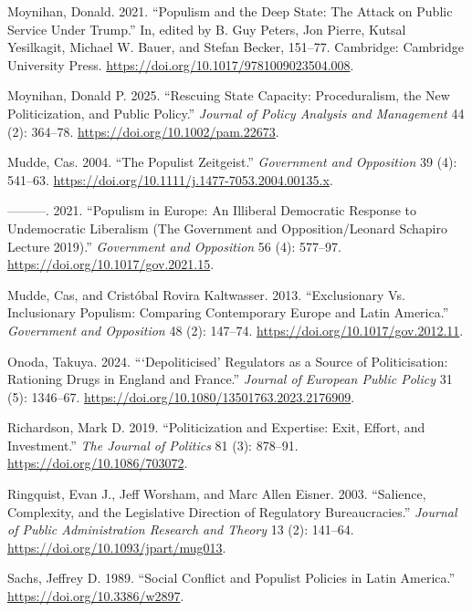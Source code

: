 \documentclass[
  11pt,
  letterpaper,
  DIV=11,
  numbers=noendperiod]{scrartcl}
\newlength{\cslhangindent}
\newenvironment{CSLReferences}[2] %
 {\begin{list}{}{%
  \setlength{\itemindent}{0pt}
  \setlength{\leftmargin}{0pt}
  \setlength{\parsep}{0pt}
  \ifodd #1
   \setlength{\leftmargin}{\cslhangindent}
   \setlength{\itemindent}{-1\cslhangindent}
  \fi
  \setlength{\itemsep}{#2\baselineskip}}}
 {\end{list}}
\begin{document}
\begin{CSLReferences}{1}{0}
Moynihan, Donald. 2021. {``Populism and the Deep State: The Attack on
Public Service Under Trump.''} In, edited by B. Guy Peters, Jon Pierre,
Kutsal Yesilkagit, Michael W. Bauer, and Stefan Becker, 151--77.
Cambridge: Cambridge University Press.
\url{https://doi.org/10.1017/9781009023504.008}.

Moynihan, Donald P. 2025. {``Rescuing State Capacity: Proceduralism, the
New Politicization, and Public Policy.''} \emph{Journal of Policy
Analysis and Management} 44 (2): 364--78.
\url{https://doi.org/10.1002/pam.22673}.

Mudde, Cas. 2004. {``The Populist Zeitgeist.''} \emph{Government and
Opposition} 39 (4): 541--63.
\url{https://doi.org/10.1111/j.1477-7053.2004.00135.x}.

---------. 2021. {``Populism in Europe: An Illiberal Democratic Response
to Undemocratic Liberalism (The Government and Opposition/Leonard
Schapiro Lecture 2019).''} \emph{Government and Opposition} 56 (4):
577--97. \url{https://doi.org/10.1017/gov.2021.15}.

Mudde, Cas, and Cristóbal Rovira Kaltwasser. 2013. {``Exclusionary Vs.
Inclusionary Populism: Comparing Contemporary Europe and Latin
America.''} \emph{Government and Opposition} 48 (2): 147--74.
\url{https://doi.org/10.1017/gov.2012.11}.

Onoda, Takuya. 2024. {``{`}Depoliticised{'} Regulators as a Source of
Politicisation: Rationing Drugs in England and France.''} \emph{Journal
of European Public Policy} 31 (5): 1346--67.
\url{https://doi.org/10.1080/13501763.2023.2176909}.

Richardson, Mark D. 2019. {``Politicization and Expertise: Exit, Effort,
and Investment.''} \emph{The Journal of Politics} 81 (3): 878--91.
\url{https://doi.org/10.1086/703072}.

Ringquist, Evan J., Jeff Worsham, and Marc Allen Eisner. 2003.
{``Salience, Complexity, and the Legislative Direction of Regulatory
Bureaucracies.''} \emph{Journal of Public Administration Research and
Theory} 13 (2): 141--64. \url{https://doi.org/10.1093/jpart/mug013}.

Sachs, Jeffrey D. 1989. {``Social Conflict and Populist Policies in
Latin America.''} \url{https://doi.org/10.3386/w2897}.


\end{CSLReferences}
\end{document}

